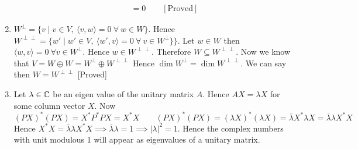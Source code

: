 \documentclass{article}
\begin{document}
\begin{enumerate}[label=5.\arabic*.]
\begin{enumerate}
\begin{align*}
		& = 0 \qquad [\text{Proved}]
	\end{align*}
		\end{enumerate}
	\item $W^{\perp}=\{v\mid v\in V, \ \langle v,w\rangle =0\ \forall\ w\in W\}$. Hence $W^{\perp\perp}=\{w'\mid w'\in V, \ \langle w',v\rangle =0\ \forall\ v\in W^{\perp}\}\}$. Let $w\in W$ then $\langle w,v\rangle =0\ \forall v\in W^{\perp}$. Hence $w\in W^{\perp\perp}$. Therefore $W\subseteq W^{\perp\perp}$. Now we know that $V=W\oplus W=W^{\perp}\oplus W^{\perp\perp}$ Hence $\dim W^{\perp}=\dim W^{\perp\perp}$. We can say then $W=W^{\perp\perp}$ [Proved]
	\addtocounter{enumi}{3}
	\item Let $\lambda \in \mathbb{C}$ be an eigen value of the unitary matrix $A$. Hence $AX=\lambda X$ for some column vector $X$. Now $$(PX)^*(PX)=X^*P^*PX=X^*X\qquad (PX)^*(PX)=(\lambda X)^*(\lambda X)=\overline{\lambda}X^*\lambda X=\overline{\lambda}\lambda X^*X $$Hence $X^*X=\overline{\lambda}\lambda X^*X\implies \overline{\lambda}\lambda =1\implies |\lambda|^2=1$. Hence the complex numbers with unit modulous 1 will appear as eigenvalues of a unitary matrix.
	\end{enumerate}
\end{document}
